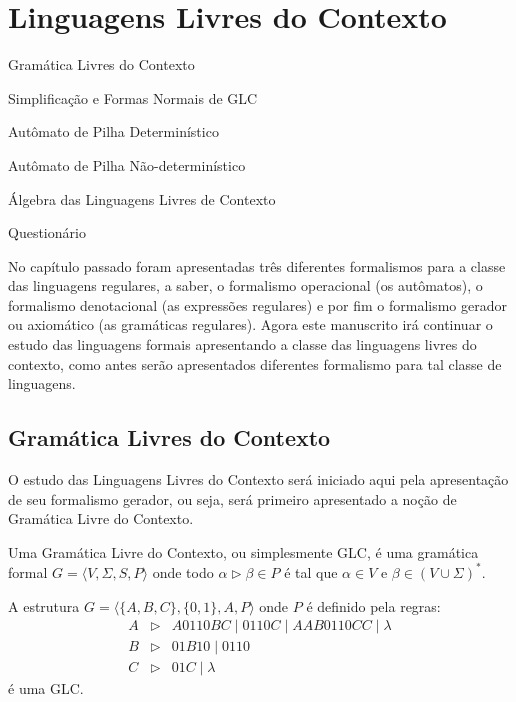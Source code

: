 
\chapter{Linguagens Livres do Contexto}\label{cap:LinguagemLLC}

\begin{introduction}[Conteúdos]
	\item Gramática Livres do Contexto
	\item Simplificação e Formas Normais de GLC
	\item Autômato de Pilha Determinístico
	\item Autômato de Pilha Não-determinístico
	\item Álgebra das Linguagens Livres de Contexto
	\item Questionário
\end{introduction}

No capítulo passado foram apresentadas três diferentes formalismos para a classe das linguagens regulares, a saber, o formalismo operacional (os autômatos), o formalismo denotacional (as expressões regulares) e por fim o formalismo gerador ou axiomático (as gramáticas regulares). Agora este manuscrito irá continuar o estudo das linguagens formais apresentando a classe das linguagens livres do contexto, como antes serão apresentados diferentes formalismo para tal classe de linguagens.

\section{Gramática Livres do Contexto}\label{sec:GLC}

O estudo das Linguagens Livres do Contexto será iniciado aqui pela apresentação de seu formalismo gerador, ou seja, será primeiro apresentado a noção de Gramática Livre do Contexto.

\begin{definition}\label{def:GLC}
	\cite{benjaLivro2010} Uma Gramática Livre do Contexto, ou simplesmente GLC, é uma gramática formal $G = \langle V, \Sigma, S, P\rangle$ onde todo $\alpha \rhd \beta \in P$ é tal que $\alpha \in V$ e $\beta \in (V \cup \Sigma)^*$.
\end{definition}

\begin{example}\label{exe:GLC-1}
	A estrutura $G = \langle \{A, B, C\}, \{0,1\}, A, P\rangle$ onde $P$ é definido pela regras:
	\begin{eqnarray*}
		A & \rhd & A0110BC \mid 0110C \mid AAB0110CC \mid \lambda\\
		B & \rhd & 01B10 \mid 0110\\
		C & \rhd & 01C \mid \lambda
	\end{eqnarray*}
	é uma GLC.
\end{example}

